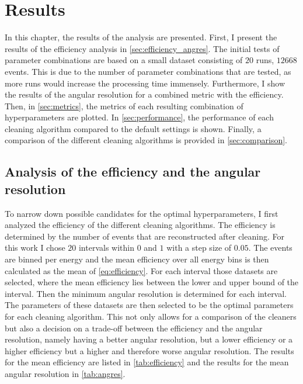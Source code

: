 \chapter{Results}
\label{ch:results}

In this chapter, the results of the analysis are presented. First, I present the results of the
efficiency analysis in \autoref{sec:efficiency_angres}. The initial tests of parameter combinations
are based on a small dataset consisting of \(\num{20}\) runs, \ie \(\num{12668}\) events. This is
due to the number of parameter combinations that are tested, as more runs would increase the
processing time immensely. Furthermore, I show the results of the angular resolution for a combined
metric with the efficiency. Then, in \autoref{sec:metrics}, the metrics of each resulting combination
of hyperparameters are plotted. In \autoref{sec:performance}, the performance of each cleaning
algorithm compared to the default settings is shown. Finally, a comparison of the different
cleaning algorithms is provided in \autoref{sec:comparison}.


\section{Analysis of the efficiency and the angular resolution}
\label{sec:efficiency_angres}

To narrow down possible candidates for the optimal hyperparameters, I first analyzed the efficiency
of the different cleaning algorithms. The efficiency is determined by the number of events that are
reconstructed after cleaning. For this work I chose \(\num{20}\) intervals within \(\num{0}\) and
\(\num{1}\) with a step size of \(\num{0.05}\). The events are binned per energy and the mean efficiency over all
energy bins is then calculated as the mean of \autoref{eq:efficiency}. For each interval those datasets are selected, where the mean efficiency
lies between the lower and upper bound of the interval. Then the minimum angular resolution is
determined for each interval. The parameters of these datasets are then selected to be the optimal
parameters for each cleaning algorithm. This not only allows for a comparison of the cleaners but also
a decision on a trade-off between the efficiency and the angular resolution, namely having a better
angular resolution, but a lower efficiency or a higher efficiency but a higher and therefore worse
angular resolution. The results for the mean efficiency are listed in \autoref{tab:efficiency} and
the results for the mean angular resolution in \autoref{tab:angres}.

